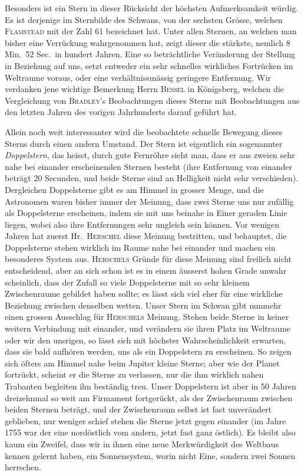 Besonders ist ein Stern in dieser Rücksicht der höchsten Aufmerksamkeit würdig. Es ist derjenige im Sternbilde des Schwans, von der sechsten Grösse, welchen \textsc{Flamstead} mit der Zahl 61 bezeichnet hat. Unter allen Sternen, an welchen man bisher eine Verrückung wahrgenommen hat, zeigt dieser die stärkste, nemlich 8 Min.\ 52 Sec.\ in hundert Jahren. Eine so beträchtliche Veränderung der Stellung in Beziehung auf uns, setzt entweder ein sehr schnelles wirkliches Fortrücken im Weltraume voraus, oder eine verhältnissmässig geringere Entfernung. Wir verdanken jene wichtige Bemerkung Herrn \textsc{Bessel} in Königsberg, welchen die Vergleichung von \textsc{Bradley}'s Beobachtungen dieses Sterns mit Beobachtungen aus den letzten Jahren des vorigen Jahrhunderts darauf geführt hat.

Allein noch weit interessanter wird die beobachtete schnelle Bewegung dieses Sterns durch einen andern Umstand. Der Stern ist eigentlich ein sogenannter \emph{Doppelstern}, das heisst, durch gute Fernröhre sieht man, dass er aus zweien sehr nahe bei einander erscheinenden Sternen besteht (ihre Entfernung von einander beträgt 20 Secunden, und beide Sterne sind an Helligkeit nicht sehr verschieden). Dergleichen Doppelsterne gibt es am Himmel in grosser Menge, und die Astronomen waren bisher immer der Meinung, dass zwei Sterne uns nur zufällig als Doppelsterne erscheinen, indem sie mit uns beinahe in Einer geraden Linie liegen, wobei also ihre Entfernungen sehr ungleich sein können. Vor wenigen Jahren hat zuerst Hr.\ \textsc{Herschel} diese Meinung bestritten, und behauptet, die Doppelsterne stehen wirklich im Raume nahe bei einander und machen ein besonderes System aus. \textsc{Herschels} Gründe für diese Meinung sind freilich nicht entscheidend, aber an sich schon ist es in einem äusserst hohen Grade unwahr%
%
scheinlich, dass der Zufall so viele Doppelsterne mit so sehr kleinem Zwischenraume gebildet haben sollte; es lässt sich viel eher für eine wirkliche Beziehung zwischen denselben wetten. Unser Stern im Schwan gibt nunmehr einen grossen Ausschlag für \textsc{Herschels} Meinung. Stehen beide Sterne in keiner weitern Verbindung mit einander, und verändern sie ihren Platz im Weltraume oder wir den unsrigen, so lässt sich mit höchster Wahrscheinlichkeit erwarten, dass sie bald aufhören werden, uns als ein Doppelstern zu erscheinen. So zeigen sich öfters am Himmel nahe beim Jupiter kleine Sterne; aber wie der Planet fortrückt, scheint er die Sterne zu verlassen, nur die ihm wirklich nahen Trabanten begleiten ihn beständig treu. Unser Doppelstern ist aber in 50 Jahren dreizehnmal so weit am Firmament fortgerückt, als der Zwischenraum zwischen beiden Sternen beträgt, und der Zwischenraum selbst ist fast unverändert geblieben, nur weniger schief stehen die Sterne jetzt gegen einander (im Jahre 1755 war der eine nordöstlich vom andern, jetzt fast ganz östlich). Es bleibt also kaum ein Zweifel, dass wir in ihnen eine neue Merkwürdigkeit des Weltbaus kennen gelernt haben, ein Sonnensystem, worin nicht Eine, sondern zwei Sonnen herrschen.


